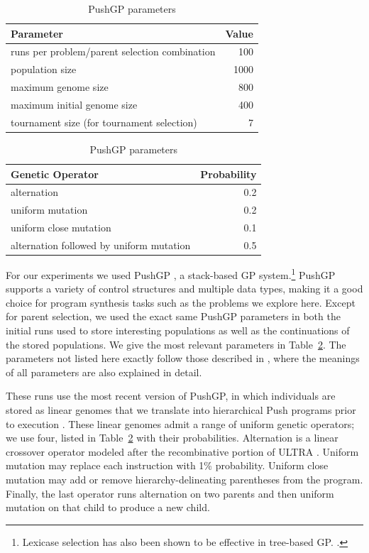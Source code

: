 \documentclass{sig-alternate-05-2015}
\begin{document}
\begin{table}[t]
\centering
\caption{PushGP parameters}
\label{table:parameters}
\begin{tabular}{l r}
\toprule
\textbf{Parameter} & \textbf{Value} \tabularnewline
\midrule
runs per problem/parent selection combination & 100 \tabularnewline
population size & 1000 \tabularnewline
maximum genome size & 800 \tabularnewline
maximum initial genome size & 400 \tabularnewline
tournament size (for tournament selection) & 7 \tabularnewline
\midrule
\end{tabular}
\begin{tabular}{l r}
\textbf{Genetic Operator} & \textbf{Probability} \tabularnewline
\midrule
alternation & 0.2 \tabularnewline
uniform mutation & 0.2 \tabularnewline
uniform close mutation & 0.1 \tabularnewline
alternation followed by uniform mutation & 0.5 \tabularnewline
\bottomrule
\end{tabular}
\vspace{-0.25 cm}
\end{table}

For our experiments we used PushGP \cite{spector:2002:GPEM, 1068292}, a stack-based GP system.\footnote{Lexicase selection has also been shown to be effective in tree-based GP. \cite{Helmuth:2015:ieeeTEC, Krawiec:2015:GECCO:smgpWorkshop}.} PushGP supports a variety of control structures and multiple data types, making it a good choice for program synthesis tasks such as the problems we explore here.
Except for parent selection, we used the exact same PushGP parameters in both the initial runs used to store interesting populations as well as the continuations of the stored populations. We give the most relevant parameters in Table~\ref{table:parameters}. The parameters not listed here exactly follow those described in \cite{Helmuth:2015:dissertation}, where the meanings of all parameters are also explained in detail.

These runs use the most recent version of PushGP, in which individuals are stored as linear genomes that we translate into hierarchical Push programs prior to execution \cite{Helmuth:2015:dissertation}. These linear genomes admit a range of uniform genetic operators; we use four, listed in Table~\ref{table:parameters} with their probabilities. Alternation is a linear crossover operator modeled after the recombinative portion of ULTRA \cite{Spector:2013:GPTP}. Uniform mutation may replace each instruction with 1\% probability. Uniform close mutation may add or remove hierarchy-delineating parentheses from the program.
Finally, the last operator runs alternation on two parents and then uniform mutation on that child to produce a new child.
\end{document}
